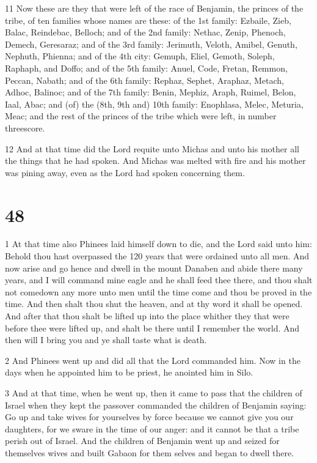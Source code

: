\par 11 Now these are they that were left of the race of Benjamin, the princes of the tribe, of ten families whose names are these: of the 1st family: Ezbaile, Zieb, Balac, Reindebac, Belloch; and of the 2nd family: Nethac, Zenip, Phenoch, Demech, Geresaraz; and of the 3rd family: Jerimuth, Veloth, Amibel, Genuth, Nephuth, Phienna; and of the 4th city: Gemuph, Eliel, Gemoth, Soleph, Raphaph, and Doffo; and of the 5th family: Anuel, Code, Fretan, Remmon, Peccan, Nabath; and of the 6th family: Rephaz, Sephet, Araphaz, Metach, Adhoc, Balinoc; and of the 7th family: Benin, Mephiz, Araph, Ruimel, Belon, Iaal, Abac; and (of) the (8th, 9th and) 10th family: Enophlasa, Melec, Meturia, Meac; and the rest of the princes of the tribe which were left, in number threescore. 

\par 12 And at that time did the Lord requite unto Michas and unto his mother all the things that he had spoken. And Michas was melted with fire and his mother was pining away, even as the Lord had spoken concerning them.

\chapter{48}

\par 1 At that time also Phinees laid himself down to die, and the Lord said unto him: Behold thou hast overpassed the 120 years that were ordained unto all men. And now arise and go hence and dwell in the mount Danaben and abide there many years, and I will command mine eagle and he shall feed thee there, and thou shalt not comedown any more unto men until the time come and thou be proved in the time. And then shalt thou shut the heaven, and at thy word it shall be opened. And after that thou shalt be lifted up into the place whither they that were before thee were lifted up, and shalt be there until I remember the world. And then will I bring you and ye shall taste what is death. 

\par 2 And Phinees went up and did all that the Lord commanded him. Now in the days when he appointed him to be priest, he anointed him in Silo.

\par 3 And at that time, when he went up, then it came to pass that the children of Israel when they kept the passover commanded the children of Benjamin saying: Go up and take wives for yourselves by force because we cannot give you our daughters, for we sware in the time of our anger: and it cannot be that a tribe perish out of Israel. And the children of Benjamin went up and seized for themselves wives and built Gabaon for them selves and began to dwell there.

